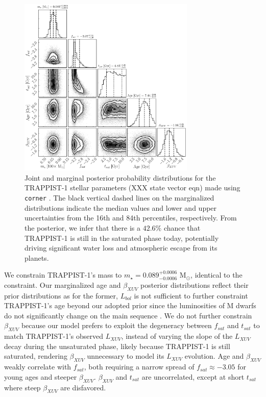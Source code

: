 \documentclass[twocolumn]{aastex62}
\begin{document}
\begin{figure}[t]
\centering
	\includegraphics[width=0.75\textwidth]{../Analysis/Corner/trappist1Corner.pdf}
   \caption{Joint and marginal posterior probability distributions for the TRAPPIST-1 stellar parameters (XXX state vector eqn) made using \texttt{corner} \citep{ForemanMackey2016}. The black vertical dashed lines on the marginalized distributions indicate the median values and lower and upper uncertainties from the 16th and 84th percentiles, respectively. From the posterior, we infer that there is a $42.6\%$ chance that TRAPPIST-1 is still in the saturated phase today, potentially driving significant water loss and atmospheric escape from its planets.}%
    \label{fig:corner}%
\end{figure}

We constrain TRAPPIST-1's mass to $m_{\star} = 0.089^{+0.0006}_{-0.0006}$ M$_{\odot}$, identical to the \citet{vanGrootel2018} constraint. Our marginalized age and $\beta_{XUV}$ posterior distributions reflect their prior distributions as for the former, $L_{bol}$ is not sufficient to further constraint TRAPPIST-1's age beyond our adopted prior since the luminosities of M dwarfs do not significantly change on the main sequence \citep{Baraffe2015}. We do not further constrain $\beta_{XUV}$ because our model prefers to exploit the degeneracy between $f_{sat}$ and $t_{sat}$ to match TRAPPIST-1's observed $L_{XUV}$, instead of varying the slope of the $L_{XUV}$ decay during the unsaturated phase, likely because TRAPPIST-1 is still saturated, rendering $\beta_{XUV}$ unnecessary to model its $L_{XUV}$ evolution. Age and $\beta_{XUV}$ weakly correlate with $f_{sat}$, both requiring a narrow spread of $f_{sat} \approx -3.05$ for young ages and steeper $\beta_{XUV}$. $\beta_{XUV}$ and $t_{sat}$ are uncorrelated, except at short $t_{sat}$ where steep $\beta_{XUV}$ are disfavored.
\end{document}
